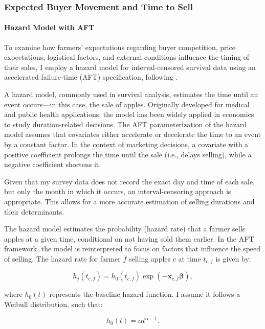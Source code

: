 \documentclass[12pt]{article}
\begin{document}
\newpage
\subsubsection{Expected Buyer Movement and Time to Sell}

\paragraph{Hazard Model with AFT}

To examine how farmers' expectations regarding buyer competition, price expectations, logistical factors, and external conditions influence the timing of their sales, I employ a hazard model for interval-censored survival data using an accelerated failure-time (AFT) specification, following \cite{albuquerque2024market}.  

A hazard model, commonly used in survival analysis, estimates the time until an event occurs—in this case, the sale of apples. Originally developed for medical and public health applications, the model has been widely applied in economics to study duration-related decisions. The AFT parameterization of the hazard model assumes that covariates either accelerate or decelerate the time to an event by a constant factor. In the context of marketing decisions, a covariate with a positive coefficient prolongs the time until the sale (i.e., delays selling), while a negative coefficient shortens it.  

Given that my survey data does not record the exact day and time of each sale, but only the month in which it occurs, an interval-censoring approach is appropriate. This allows for a more accurate estimation of selling durations and their determinants.  

The hazard model estimates the probability (hazard rate) that a farmer sells apples at a given time, conditional on not having sold them earlier. In the AFT framework, the model is reinterpreted to focus on factors that influence the speed of selling. The hazard rate for farmer $f$ selling apples $c$ at time $t_{c,f}$ is given by:  

\begin{equation}
    h_j(t_{c,f}) = h_0(t_{c,f}) \exp\left(-\mathbf{x}_{c,f} \boldsymbol{\beta}\right),
\end{equation}

where $h_0(t)$ represents the baseline hazard function. I assume it follows a Weibull distribution, such that:  

\begin{equation}
    h_0(t) = \alpha t^{\alpha-1}.
\end{equation}
\end{document}
